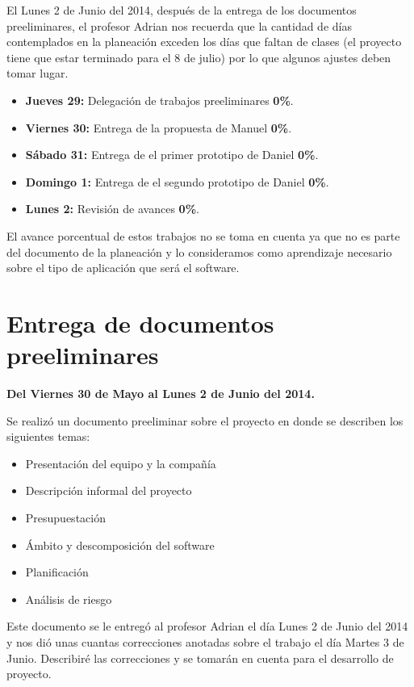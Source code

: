 \documentclass[letterpaper]{article}
\begin{document}
El Lunes 2 de Junio del 2014, después de la entrega de los documentos preeliminares, el profesor Adrian nos recuerda que la cantidad de días contemplados en la planeación exceden los días que faltan de clases (el proyecto tiene que estar terminado para el 8 de julio) por lo que algunos ajustes deben tomar lugar.

\begin{itemize}
  \item \textbf{Jueves 29:} Delegación de trabajos preeliminares \textbf{0\%}.
  \item \textbf{Viernes 30:} Entrega de la propuesta de Manuel \textbf{0\%}.
  \item \textbf{Sábado 31:} Entrega de el primer prototipo de Daniel \textbf{0\%}.
  \item \textbf{Domingo 1:} Entrega de el segundo prototipo de Daniel \textbf{0\%}.
  \item \textbf{Lunes 2:} Revisión de avances \textbf{0\%}.
\end{itemize}

El avance porcentual de estos trabajos no se toma en cuenta ya que no es parte del documento de la planeación y lo consideramos como aprendizaje necesario sobre el tipo de aplicación que será el software.

\section{Entrega de documentos preeliminares}
\textbf{Del Viernes 30 de Mayo al Lunes 2 de Junio del 2014.}

Se realizó un documento preeliminar sobre el proyecto en donde se describen los siguientes temas:

\begin{itemize}
\item Presentación del equipo y la compañía
\item Descripción informal del proyecto
\item Presupuestación
\item Ámbito y descomposición del software
\item Planificación
\item Análisis de riesgo
\end{itemize}

Este documento se le entregó al profesor Adrian el día Lunes 2 de Junio del 2014 y nos dió unas cuantas correcciones anotadas sobre el trabajo el día Martes 3 de Junio. Describiré las correcciones y se tomarán en cuenta para el desarrollo de proyecto.
\end{document}
